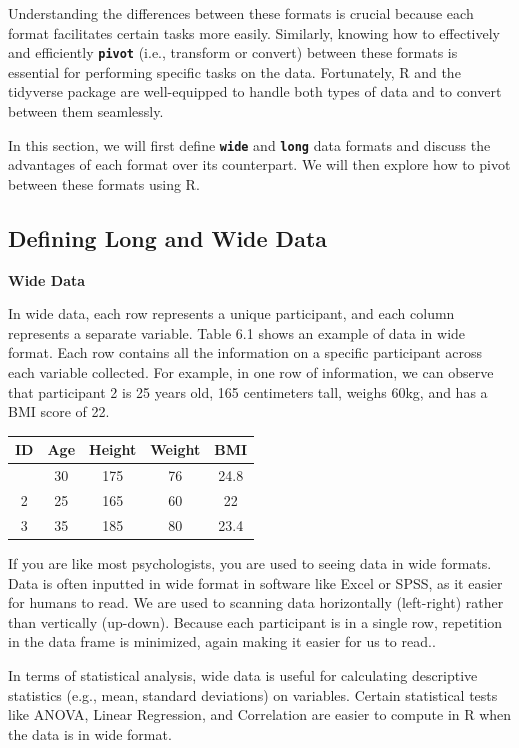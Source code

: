 \documentclass[
]{book}
\begin{document}
Understanding the differences between these formats is crucial because each format facilitates certain tasks more easily. Similarly, knowing how to effectively and efficiently \textbf{\texttt{pivot}} (i.e., transform or convert) between these formats is essential for performing specific tasks on the data. Fortunately, R and the tidyverse package are well-equipped to handle both types of data and to convert between them seamlessly.

In this section, we will first define \textbf{\texttt{wide}} and \textbf{\texttt{long}} data formats and discuss the advantages of each format over its counterpart. We will then explore how to pivot between these formats using R.

\hypertarget{defining-long-and-wide-data}{%
\subsection{Defining Long and Wide Data}\label{defining-long-and-wide-data}}

\textbf{Wide Data}

In wide data, each row represents a unique participant, and each column represents a separate variable. Table 6.1 shows an example of data in wide format. Each row contains all the information on a specific participant across each variable collected. For example, in one row of information, we can observe that participant 2 is 25 years old, 165 centimeters tall, weighs 60kg, and has a BMI score of 22.

\begin{longtable}[]{@{}ccccc@{}}
\toprule\noalign{}
ID & Age & Height & Weight & BMI \\
\midrule\noalign{}
\endhead
\bottomrule\noalign{}
\endlastfoot
1 & 30 & 175 & 76 & 24.8 \\
2 & 25 & 165 & 60 & 22 \\
3 & 35 & 185 & 80 & 23.4 \\
\end{longtable}

If you are like most psychologists, you are used to seeing data in wide formats. Data is often inputted in wide format in software like Excel or SPSS, as it easier for humans to read. We are used to scanning data horizontally (left-right) rather than vertically (up-down). Because each participant is in a single row, repetition in the data frame is minimized, again making it easier for us to read..

In terms of statistical analysis, wide data is useful for calculating descriptive statistics (e.g., mean, standard deviations) on variables. Certain statistical tests like ANOVA, Linear Regression, and Correlation are easier to compute in R when the data is in wide format.
\end{document}
